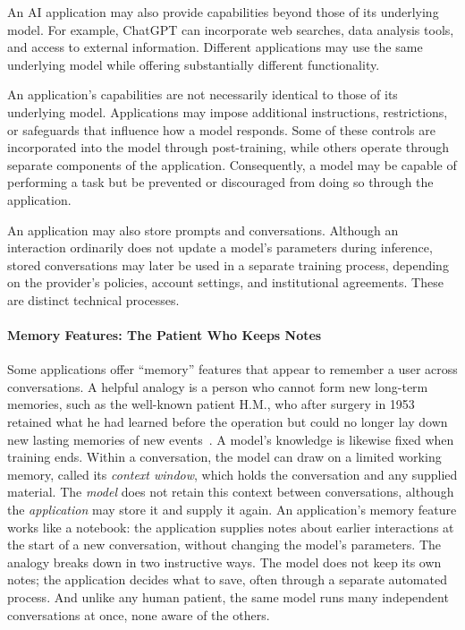 \documentclass[11pt]{article}
\begin{document}
An AI application may also provide capabilities beyond those of its underlying model. For example, ChatGPT can incorporate web searches, data analysis tools, and access to external information. Different applications may use the same underlying model while offering substantially different functionality.

An application's capabilities are not necessarily identical to those of its underlying model. Applications may impose additional instructions, restrictions, or safeguards that influence how a model responds. Some of these controls are incorporated into the model through post-training, while others operate through separate components of the application. Consequently, a model may be capable of performing a task but be prevented or discouraged from doing so through the application.

An application may also store prompts and conversations. Although an
interaction ordinarily does not update a model's parameters during
inference, stored conversations may later be used in a separate training
process, depending on the provider's policies, account settings, and
institutional agreements. These are distinct technical processes.

\paragraph{Memory Features: The Patient Who Keeps Notes}
Some applications offer ``memory'' features that appear to remember a user
across conversations. A helpful analogy is a person who cannot form new
long-term memories, such as the well-known patient H.M., who after surgery
in 1953 retained what he had learned before the operation but could no
longer lay down new lasting memories of new events~\citep{scoville1957}. 
A model's knowledge is likewise fixed when training ends.
Within a conversation, the model can draw on a limited working memory,
called its \emph{context window}, which holds the conversation and any
supplied material. The \emph{model} does not retain this context between conversations, 
although the \emph{application} may store it and supply it again.
An application's memory feature works like a notebook: the application
supplies notes about earlier interactions at the start of a new
conversation, without changing the model's parameters. The analogy breaks
down in two instructive ways. The model does not keep its own notes; the
application decides what to save, often through a separate automated
process. And unlike any human patient, the same model runs many
independent conversations at once, none aware of the others.
\end{document}
